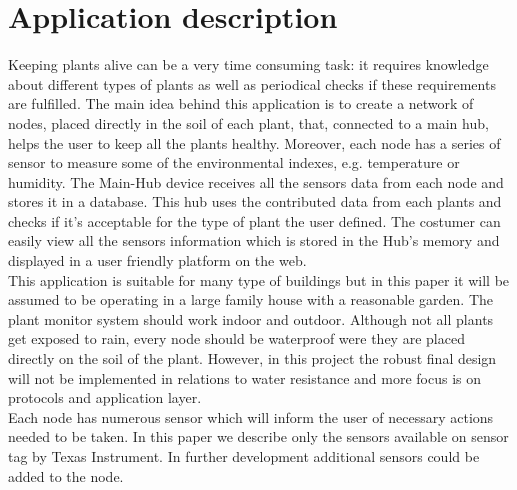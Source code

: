 \section{Application description}
Keeping plants alive can be a very time consuming task: it requires knowledge about different types of plants as well as periodical checks if these requirements are fulfilled. 
The main idea behind this application is to create a network of nodes, placed directly in the soil of each plant, that, connected to a main hub, helps the user to keep all the plants healthy. Moreover, each node has a series of sensor to measure some of the environmental indexes, e.g. temperature or humidity. The Main-Hub device receives all the sensors data from each node and stores it in a database. This hub uses the contributed data from each plants and checks if it's acceptable for the type of plant the user defined. The costumer can easily view all the sensors information which is stored in the Hub's memory and displayed in a user friendly platform on the web.	\\
This application is suitable for many type of buildings but in this paper it will be assumed to be operating in a large family house with a reasonable garden. The plant monitor system should work indoor and outdoor. Although not all plants get exposed to rain, every node should be waterproof were they are placed directly on the soil of the plant. However, in this project the robust final design will not be implemented in relations to water resistance and more focus is on protocols and application layer.\\
Each node has numerous sensor which will inform the user of necessary actions needed to be taken. In this paper we describe only the sensors available on sensor tag by Texas Instrument. In further development additional sensors could be added to the node.
 \\